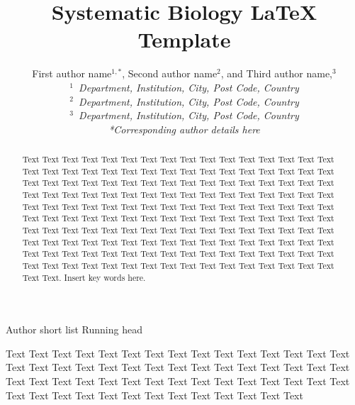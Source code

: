 \documentclass[oupdraft]{sysbio}
\begin{document}
\title{Systematic Biology \LaTeX{} Template}

\author{First author name$^{1,\ast}$, Second author name$^{2}$, and
Third author name,$^{3}$\\[4pt]
\textit{$^{1}$~Department, Institution, City, Post Code, Country}
\\
\textit{$^{2}$~Department, Institution, City, Post Code, Country}
\\
\textit{$^{3}$~Department, Institution, City, Post Code, Country}
\\[2pt]
\textit{*Corresponding author details here}}

\markboth%
{Author short list}
{Running head}

\maketitle

\begin{abstract}
{Text Text Text Text Text Text Text Text Text Text Text Text Text Text Text Text Text Text Text Text Text Text Text Text Text Text Text Text Text Text Text Text Text Text Text Text Text Text Text Text Text Text Text Text Text Text Text Text Text Text Text Text Text Text Text Text Text Text Text Text Text Text Text Text Text Text Text Text Text Text Text Text Text Text Text Text Text Text Text Text Text Text Text Text Text Text Text Text Text Text Text Text Text Text Text Text Text Text Text Text Text Text Text Text Text Text Text Text Text Text Text Text Text Text Text Text Text Text Text Text Text Text Text Text Text Text Text Text Text Text Text Text Text Text Text Text Text Text Text Text Text Text Text Text Text Text Text Text Text Text Text Text Text Text Text Text Text Text Text Text Text Text.}
{Insert key words here.}
\end{abstract}
\newline

Text Text Text Text Text Text Text Text Text Text Text Text Text Text Text Text Text Text Text Text Text Text Text Text Text Text Text Text Text Text Text Text Text Text Text Text Text Text Text Text Text Text Text Text Text Text Text Text Text Text Text Text Text Text Text Text Text Text \citet{Author20XX}
\end{document}
